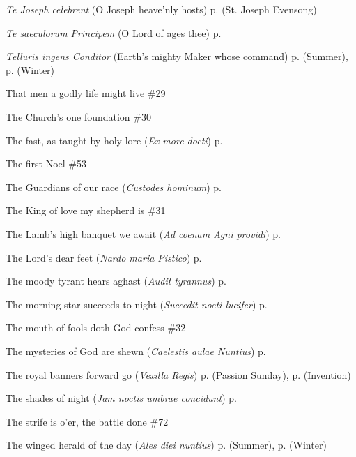 \begin{hangparas}{1.25em}{1}
\textit{Te Joseph celebrent} (O Joseph heave'nly hosts) \dotfill p. \pageref{JosephEvensong} (St. Joseph Evensong)
\par\noindent
\textit{Te saeculorum Principem} (O Lord of ages thee) \dotfill p. \pageref{ChristTheKingEvensong}
\par\noindent
\textit{Telluris ingens Conditor} (Earth's mighty Maker whose command) \dotfill p. \pageref{TuesdayEvensongSummer} (Summer), p. \pageref{TuesdayEvensongWinter} (Winter)
\par\noindent
That men a godly life might live \dotfill \#29
\par\noindent
The Church's one foundation \dotfill \#30
\par\noindent
The fast, as taught by holy lore (\textit{Ex more docti}) \dotfill p. \pageref{FirstLentInvitatory}
\par\noindent
The first Noel \dotfill \#53
\par\noindent
The Guardians of our race (\textit{Custodes hominum}) \dotfill p. \pageref{GuardianAngelsEvensong}
\par\noindent
The King of love my shepherd is \dotfill \#31
\par\noindent
The Lamb's high banquet we await (\textit{Ad coenam Agni providi}) \dotfill p. \pageref{EasterEvensong}
\par\noindent
The Lord's dear feet (\textit{Nardo maria Pistico}) \dotfill p. \pageref{MaryMagdaleneInvitatory}
\par\noindent
The moody tyrant hears aghast (\textit{Audit tyrannus}) \dotfill p. \pageref{HolyInnocentsInvitatory}
\par\noindent
The morning star succeeds to night (\textit{Succedit nocti lucifer}) \dotfill p. \pageref{AnneMattins}
\par\noindent
The mouth of fools doth God confess \dotfill \#32
\par\noindent
The mysteries of God are shewn (\textit{Caelestis aulae Nuntius}) \dotfill p. \pageref{HolyRosaryEvensong}
\par\noindent
The royal banners forward go (\textit{Vexilla Regis}) \dotfill p. \pageref{PassionSundayEvensong} (Passion Sunday), p. \pageref{InventionEvensong} (Invention)
\par\noindent
The shades of night (\textit{Jam noctis umbrae concidunt}) \dotfill p. \pageref{ScholasticaMattins}
\par\noindent
The strife is o'er, the battle done \dotfill \#72
\par\noindent
The winged herald of the day (\textit{Ales diei nuntius}) \dotfill p. \pageref{TuesdayMattinsSummer} (Summer), p. \pageref{TuesdayMattinsWinter} (Winter)

\end{hangparas}
